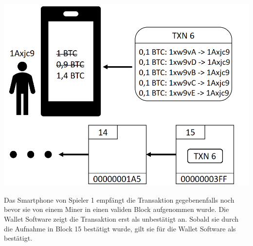 \vspace{1cm}
\begin{minipage}{0.55\textwidth}
\includegraphics[width=\textwidth]{Figures/konzept_btc/konzept12}
\centering
\decoRule
{}
\label{fig:konzept12}
\end{minipage}
\begin{minipage}{0.45\textwidth}
Das Smartphone von Spieler 1 empfängt die Transaktion gegebenenfalls noch bevor sie von einem Miner in einen validen Block aufgenommen wurde. Die Wallet Software zeigt die Transaktion erst als unbestätigt an. Sobald sie durch die Aufnahme in Block 15 bestätigt wurde, gilt sie für die Wallet Software als bestätigt.
\end{minipage}